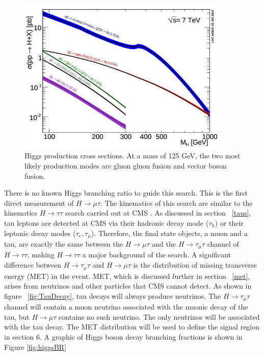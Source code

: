 \documentclass[oneside, letterpaper, oldfontcommands]{memoir}
\begin{document}
\begin{figure}[here]
\includegraphics[width=0.9\textwidth]{higgsproduction.jpg}
\caption{Higgs production cross sections\cite{Dittmaier:2011ti}. At a mass of 125 GeV, the two most likely production modes are gluon gluon fusion and vector boson fusion.}
\label{fig:higgsproduction}
\end{figure}

\qquad There is no known Higgs branching ratio to guide this search. This is the first direct measurement of $H \rightarrow \mu \tau$. The kinematics of this search are similar to the kinematics $H \rightarrow \tau\tau$ search carried out at CMS \cite{Chatrchyan:2012xdj}. As discussed in section ~\ref{taus}, tau leptons are detected at CMS via their hadronic decay mode ($\tau_{h}$) or their leptonic decay modes ($\tau_{e}, \tau_{\mu}$). Therefore, the final state objects, a muon and a tau, are exactly the same between the $H \rightarrow \mu \tau$ and the $H \rightarrow \tau_{\mu} \tau$ channel of $H \rightarrow \tau\tau$, making $H \rightarrow \tau\tau$ a major background of the search. A significant difference between $H \rightarrow \tau_{\mu} \tau$ and $H \rightarrow \mu \tau$ is the distribution of missing transverse energy (MET) in the event. MET, which is discussed further in section ~\ref{met}, arises from neutrinos and other particles that CMS cannot detect. As shown in figure ~\ref{fig:TauDecay}, tau decays will always produce neutrinos. The $H \rightarrow \tau_{\mu} \tau$ channel will contain a muon neutrino associated with the muonic decay of the tau, but $H \rightarrow \mu \tau$ contains no such neutrino. The only neutrinos will be associated with the tau decay. The MET distribution will be used to define the signal region in section 6. A graphic of Higgs boson decay branching fractions is shown in Figure \ref{fig:higgsBR}\cite{Heinemeyer:2013tqa}
\end{document}
